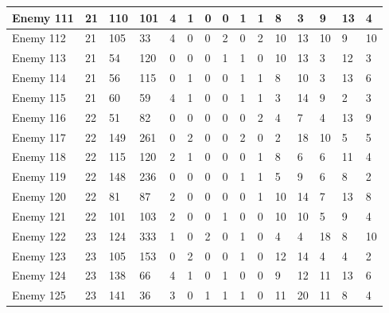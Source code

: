 \begin{sidewaystable}[!h]
{\begin{tabular}{|l|l|l|l|l|l|l|l|l|l|l|l|l|l|l|}
			Enemy 111 & 21 & 110 & 101 & 4 & 1 & 0 & 0 & 1 & 1 & 8 & 3 & 9 & 13 & 4 \\ \hline
			Enemy 112 & 21 & 105 & 33 & 4 & 0 & 0 & 2 & 0 & 2 & 10 & 13 & 10 & 9 & 10 \\ \hline
			Enemy 113 & 21 & 54 & 120 & 0 & 0 & 0 & 1 & 1 & 0 & 10 & 13 & 3 & 12 & 3 \\ \hline
			Enemy 114 & 21 & 56 & 115 & 0 & 1 & 0 & 0 & 1 & 1 & 8 & 10 & 3 & 13 & 6 \\ \hline
			Enemy 115 & 21 & 60 & 59 & 4 & 1 & 0 & 0 & 1 & 1 & 3 & 14 & 9 & 2 & 3 \\ \hline
			Enemy 116 & 22 & 51 & 82 & 0 & 0 & 0 & 0 & 0 & 2 & 4 & 7 & 4 & 13 & 9 \\ \hline
			Enemy 117 & 22 & 149 & 261 & 0 & 2 & 0 & 0 & 2 & 0 & 2 & 18 & 10 & 5 & 5 \\ \hline
			Enemy 118 & 22 & 115 & 120 & 2 & 1 & 0 & 0 & 0 & 1 & 8 & 6 & 6 & 11 & 4 \\ \hline
			Enemy 119 & 22 & 148 & 236 & 0 & 0 & 0 & 0 & 1 & 1 & 5 & 9 & 6 & 8 & 2 \\ \hline
			Enemy 120 & 22 & 81 & 87 & 2 & 0 & 0 & 0 & 0 & 1 & 10 & 14 & 7 & 13 & 8 \\ \hline
			Enemy 121 & 22 & 101 & 103 & 2 & 0 & 0 & 1 & 0 & 0 & 10 & 10 & 5 & 9 & 4 \\ \hline
			Enemy 122 & 23 & 124 & 333 & 1 & 0 & 2 & 0 & 1 & 0 & 4 & 4 & 18 & 8 & 10 \\ \hline
			Enemy 123 & 23 & 105 & 153 & 0 & 2 & 0 & 0 & 1 & 0 & 12 & 14 & 4 & 4 & 2 \\ \hline
			Enemy 124 & 23 & 138 & 66 & 4 & 1 & 0 & 1 & 0 & 0 & 9 & 12 & 11 & 13 & 6 \\ \hline
			Enemy 125 & 23 & 141 & 36 & 3 & 0 & 1 & 1 & 1 & 0 & 11 & 20 & 11 & 8 & 4 \\ \hline
		\end{tabular}%
	}
\end{sidewaystable}
\clearpage


